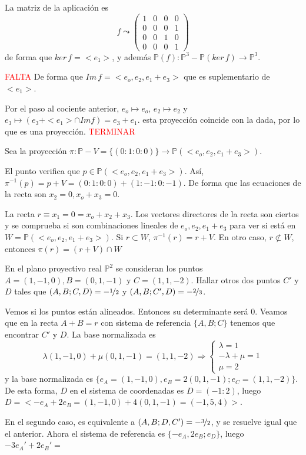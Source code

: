 \begin{sol}
    La matriz de la aplicaci\'on es
    $$f \leadsto \begin{pmatrix}
        1 & 0 & 0 & 0 \\ 0 & 0 & 0 & 1 \\ 0 & 0 & 1 & 0 \\ 0 & 0 & 0 & 1
    \end{pmatrix}$$
    de forma que $ker\, f = <e_1>$, y adem\'as $\mathbb P(f): \mathbb P^3 - \mathbb P(ker\, f) \longrightarrow \mathbb P^3$. 

    \textcolor{red}{FALTA}
    De forma que $Im \, f = <e_o,e_2,e_1+e_3>$ que es suplementario de $<e_1>$. 

    Por el paso al cociente anterior, $e_o \longmapsto e_o$, $e_2 \longmapsto e_2$ y $e_3 \longmapsto (e_3+<e_1> \cap Im f) = e_3+e_1$. esta proyecci\'on coincide con la dada, por lo que es una proyecci\'on.
    \textcolor{red}{TERMINAR}

    Sea la proyecci\'on $\pi : \mathbb P - V = \{(0:1:0:0)\} \longrightarrow \mathbb P(<e_o,e_2,e_1+e_3>)$.
    
    El punto verifica que $p \in \mathbb P(<e_o,e_2,e_1+e_3>)$. As\'i, $\pi^{-1}(p)=p+V=(0:1:0:0)+(1:-1:0:-1)$. De forma que las ecuaciones de la recta son $x_2=0, x_o+x_3=0$. 

    La recta $r \equiv x_1 = 0 = x_o + x_2 + x_3$. Los vectores directores de la recta son ciertos y se comprueba si son combinaciones lineales de $e_o, e_2, e_1+e_3$ para ver si est\'a en $W=\mathbb P(<e_o,e_2,e_1+e_3>)$. Si $r \subset W$, $\pi^{-1}(r) = r+V$. En otro caso, $r \nsubset W$, entonces $\pi(r)=(r+V)\cap W$
\end{sol}
\begin{ejer}
    [7] En el plano proyectivo real $\mathbb P^2$ se consideran los puntos $A = (1, -1, 0), B = (0, 1, -1)$ y $C = (1, 1, -2)$. Hallar otros dos puntos $C'$ y $D$ tales que $(A, B; C, D) = -\nicefrac{1}{2}$ y $(A, B; C' , D) = -\nicefrac{2}{3}$. 
\end{ejer}\begin{sol}
    Vemos si los puntos est\'an alineados. Entonces su determinante ser\'a 0. Veamos que en la recta $A+B=r$ con sistema de referencia $\{A,B;C\}$ tenemos que encontrar $C'$ y $D$. La base normalizada es 
    $$\lambda(1,-1,0)+\mu(0,1,-1)=(1,1,-2) \Rightarrow \begin{cases}
        \lambda=1 \\ -\lambda+\mu=1 \\ \mu=2
    \end{cases}$$
    y la base normalizada es $\{e_A=(1,-1,0),e_B=2(0,1,-1);e_C=(1,1,-2)\}$. De esta forma, $D$ en el sistema de coordenadas es $D=(-1:2)$, luego $D=<-e_A+2e_B=(1,-1,0)+4(0,1,-1) = (-1,5,4)>$.

    En el segundo caso, es equivalente a $(A, B; D, C') = -\nicefrac{3}{2}$, y se resuelve igual que el anterior. Ahora el sistema de referencia es $\{-e_A, 2e_B; e_D\}$, luego $-3e_A'+2e_B'=$
    
\end{sol}


